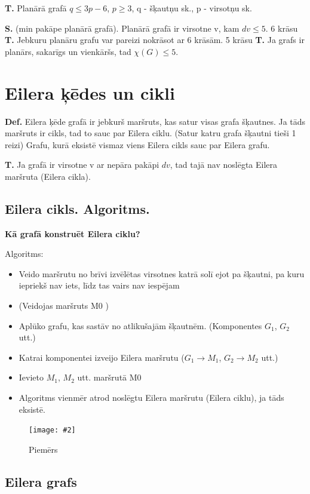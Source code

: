 \documentclass{article}
\newcommand{\illustration}[3]{
	\begin{figure}[H]
		\centering	
		\texttt{[image: \#2]}
		\caption{#3}
	\end{figure}
}
\begin{document}
\textbf{T.} Planārā grafā $q \le 3p − 6$, $p \ge 3$, q - šķautņu sk., p - virsotņu sk.

\textbf{S. }(min pakāpe planārā grafā). Planārā grafā ir virsotne v, kam $dv \le 5$.
6 krāsu \textbf{T. }Jebkuru planāru grafu var pareizi nokrāsot ar 6 krāsām.
5 krāsu \textbf{T. }Ja grafs ir planārs, sakarīgs un vienkāršs, tad $\chi(G ) \le 5$.

\section{Eilera ķēdes un cikli}


\textbf{Def.}  Eilera ķēde grafā ir jebkurš maršruts, kas satur visas grafa šķautnes.
Ja tāds maršruts ir cikls, tad to sauc par Eilera ciklu. (Satur katru grafa šķautni tieši 1 reizi) Grafu, kurā eksistē vismaz viens Eilera cikls sauc par Eilera grafu.

\textbf{T. } Ja grafā ir virsotne v ar nepāra pakāpi $dv$, tad tajā nav noslēgta Eilera maršruta (Eilera cikla). 

\subsection{Eilera cikls. Algoritms.}
\textbf{Kā grafā konstruēt Eilera ciklu?}

Algoritms:
\begin{itemize}
	\item Veido maršrutu no brīvi izvēlētas virsotnes katrā solī ejot pa šķautni, pa kuru iepriekš nav iets, līdz tas vairs nav iespējam
	\item (Veidojas maršruts M0 )
	\item Aplūko grafu, kas sastāv no atlikušajām šķautnēm. (Komponentes $G_1$, $G_2$ utt.)
	\item Katrai komponentei izveijo Eilera maršrutu ($G_1 → M_1$, $G_2 → M_2 $ utt.)
	\item Ievieto $M_1$, $M_2$ utt. maršrutā M0
	\item Algoritms vienmēr atrod noslēgtu Eilera maršrutu (Eilera ciklu), ja tāds eksistē.
\end{itemize}

\illustration{1}{Euler_cycle_build-1}{Piemērs}

\subsection{Eilera grafs}
\end{document}
